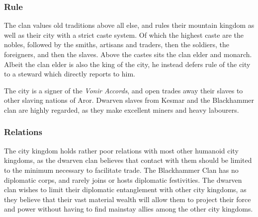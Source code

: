 \subsubsection*{Rule}

The clan values old traditions above all else, and rules their mountain
kingdom as well as their city with a strict caste system. Of which the highest
caste are the nobles, followed by the smiths, artisans and traders, then the
soldiers, the foreigners, and then the slaves. Above the castes sits the clan
elder and monarch. Albeit the clan elder is also the king of the city, he
instead defers rule of the city to a steward which directly reports to him.

The city is a signer of the \emph{Vonir Accords}, and open trades away their
slaves to other slaving nations of Aror. Dwarven slaves from Kesmar and the
Blackhammer clan are highly regarded, as they make excellent miners and heavy
labourers.

\subsubsection*{Relations}

The city kingdom holds rather poor relations with most other humanoid city
kingdoms, as the dwarven clan believes that contact with them should be limited
to the minimum necessary to facilitate trade. The Blackhammer Clan has no
diplomatic corps, and rarely joins or hosts diplomatic festivities. The
dwarven clan wishes to limit their diplomatic entanglement with other city
kingdoms, as they believe that their vast material wealth will allow them to
project their force and power without having to find mainstay allies among the
other city kingdoms.
